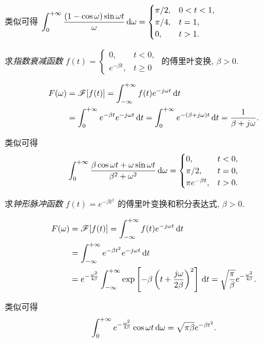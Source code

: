 类似可得
$\displaystyle\int_0^{+\infty}\frac{(1-\cos\omega)\sin\omega t}\omega\,\mathrm{d}\omega=
	\begin{cases}
		\pi/2,&0<t<1,\\
		\pi/4,&t=1,\\
		0,&t>1.
	\end{cases}$

\begin{example}
	求\emph{指数衰减函数} $f(t)=
		\begin{cases}
			0,&t<0,\\
			e^{-\beta t},&t\ge 0
		\end{cases}$ 的傅里叶变换, $\beta>0$.
\end{example}
\begin{solution}
	\begin{align*}
		F(\omega)&=\mathscr{F}[f(t)]=\int_{-\infty}^{+\infty}f(t)e^{-j\omega t}\,\mathrm{d} t\\
		&=\int_0^{+\infty}e^{-\beta t}e^{-j\omega t}\,\mathrm{d} t
			=\int_0^{+\infty}e^{-(\beta+j\omega)t}\,\mathrm{d} t
			=\frac1{\beta+j\omega}.
	\end{align*}
\end{solution}

类似可得
	\[\int_0^{+\infty}\frac{\beta\cos\omega t+\omega\sin\omega t}{\beta^2+\omega^2}\,\mathrm{d}\omega
	=\begin{cases}
		0,&t<0,\\
		\pi/2,&t=0,\\
		\pi e^{-\beta t},&t>0.
	\end{cases}\]

\begin{example}
	求\emph{钟形脉冲函数} $f(t)=e^{-\beta t^2}$ 的傅里叶变换和积分表达式, $\beta>0$.
\end{example}

\begin{solution}
	\begin{align*}
		F(\omega)&=\mathscr{F}[f(t)]=\int_{-\infty}^{+\infty}f(t)e^{-j\omega t}\,\mathrm{d} t\\
		&=\int_{-\infty}^{+\infty}e^{-\beta t^2}e^{-j\omega t}\,\mathrm{d} t\\
		&=e^{-\frac{\omega^2}{4\beta}}\int_{-\infty}^{+\infty}\exp\left[-\beta\left(t+\frac{j\omega}{2\beta}\right)^2\right]\,\mathrm{d} t
			=\sqrt{\frac\pi\beta}e^{-\frac{\omega^2}{4\beta}}.
	\end{align*}
\end{solution}

类似可得
	\[\int_0^{+\infty}e^{-\frac{\omega^2}{4\beta}}\cos\omega t\,\mathrm{d}\omega=\sqrt{\pi\beta}e^{-\beta t^2}.\]

